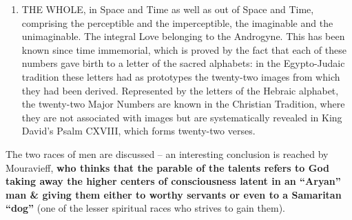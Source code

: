 \begin{quotex}
\begin{enumerate}[label=\Roman*.]
\item THE WHOLE, in Space and Time as well as out of Space and Time, comprising the perceptible and the imperceptible, the imaginable and the unimaginable. The integral Love belonging to the Androgyne. This has been known since time immemorial, which is proved by the fact that each of these numbers gave birth to a letter of the sacred alphabets: in the Egypto-Judaic tradition these letters had as prototypes the twenty-two images from which they had been derived. Represented by the letters of the Hebraic alphabet, the twenty-two Major Numbers are known in the Christian Tradition, where they are not associated with images but are systematically revealed in King David's Psalm CXVIII, which forms twenty-two verses.
\end{enumerate}
\end{quotex}


The two races of men are discussed -- an interesting conclusion is reached by Mouravieff, \textbf{who thinks that the parable of the talents refers to God taking away the higher centers of consciousness latent in an ``Aryan'' man \& giving them either to worthy servants or even to a Samaritan ``dog''} (one of the lesser spiritual races who strives to gain them).

